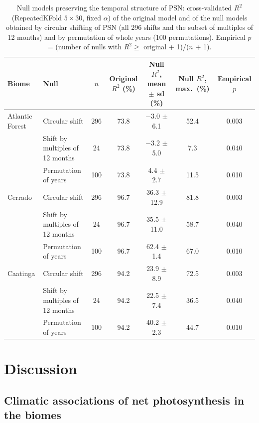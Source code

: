 \documentclass[a4paper,fleqn]{cas-sc}
\begin{document}
\begin{table}[htbp]
\caption{Null models preserving the temporal structure of PSN: cross-validated $R^2$ (RepeatedKFold $5 \times 30$, fixed $\alpha$) of the original model and of the null models obtained by circular shifting of PSN (all 296 shifts and the subset of multiples of 12 months) and by permutation of whole years (100 permutations). Empirical $p$ = (number of nulls with $R^2 \ge$ original + 1)/($n$ + 1).}\label{tbl:nulls}
\footnotesize
\begin{tabular*}{\tblwidth}{@{}LLCCCCC@{}}
\toprule
Biome & Null & $n$ & Original $R^2$ (\%) & Null $R^2$, mean $\pm$ sd (\%) & Null $R^2$, max.\ (\%) & Empirical $p$ \\
\midrule
Atlantic Forest & Circular shift & 296 & 73.8 & $-$3.0 $\pm$ 6.1 & 52.4 & 0.003 \\
 & Shift by multiples of 12 months & 24 & 73.8 & $-$3.2 $\pm$ 5.0 & 7.3 & 0.040 \\
 & Permutation of years & 100 & 73.8 & 4.4 $\pm$ 2.7 & 11.5 & 0.010 \\
Cerrado & Circular shift & 296 & 96.7 & 36.3 $\pm$ 12.9 & 81.8 & 0.003 \\
 & Shift by multiples of 12 months & 24 & 96.7 & 35.5 $\pm$ 11.0 & 58.7 & 0.040 \\
 & Permutation of years & 100 & 96.7 & 62.4 $\pm$ 1.4 & 67.0 & 0.010 \\
Caatinga & Circular shift & 296 & 94.2 & 23.9 $\pm$ 8.9 & 72.5 & 0.003 \\
 & Shift by multiples of 12 months & 24 & 94.2 & 22.5 $\pm$ 7.4 & 36.5 & 0.040 \\
 & Permutation of years & 100 & 94.2 & 40.2 $\pm$ 2.3 & 44.7 & 0.010 \\
\bottomrule
\end{tabular*}
\end{table}

\section{Discussion}\label{sec:discussion}

\subsection{Climatic associations of net photosynthesis in the biomes}
\end{document}
